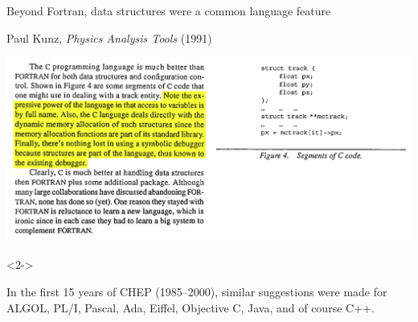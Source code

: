 \documentclass[aspectratio=169]{beamer}
\begin{document}
\begin{frame}{Beyond Fortran, data structures were a common language feature}
\vspace{0.5 cm}
\begin{center}
\begin{minipage}{0.8\linewidth}
\begin{center}
Paul Kunz, {\it Physics Analysis Tools} (1991)
\end{center}
\end{minipage}

\vspace{0.25 cm}
\includegraphics[width=0.9\linewidth]{PLOTS/kunz-physics-analysis-tools.png}
\end{center}

\begin{uncoverenv}<2->
\vspace{-2.25 cm}
\hfill\begin{minipage}{0.48\linewidth}
In the first 15 years of CHEP (1985--2000), similar suggestions were made for ALGOL, PL/I, Pascal, Ada, Eiffel, Objective C, Java, and of course C++.
\end{minipage}\hspace{-0.25 cm}
\vspace{1.5 cm}
\end{uncoverenv}
\end{frame}
\end{document}

